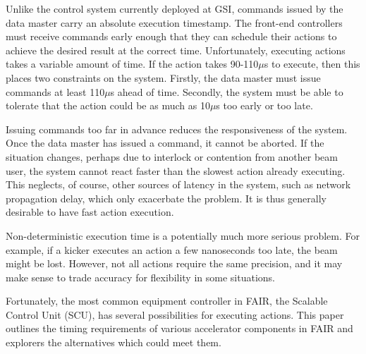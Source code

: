\documentclass{JAC2003}
\begin{document}
Unlike the control system currently deployed at GSI,
commands issued by the data master carry an absolute execution timestamp.
The front-end controllers must receive commands early enough 
that they can schedule their actions 
to achieve the desired result at the correct time.
Unfortunately, executing actions takes a variable amount of time.
If the action takes 90-110$\mu$s to execute, 
then this places two constraints on the system.
Firstly, the data master must issue commands at least 110$\mu$s ahead of time.
Secondly, the system must be able to tolerate that the action could be as
much as 10$\mu$s too early or too late.

Issuing commands too far in advance reduces the responsiveness of the system.
Once the data master has issued a command, it cannot be aborted.
If the situation changes,
perhaps due to interlock or contention from another beam user,
the system cannot react faster than the slowest action already executing.
This neglects, of course, other sources of latency in the system,
such as network propagation delay, which only exacerbate the problem.
It is thus generally desirable to have fast action execution.

Non-deterministic execution time is a potentially much more serious problem.
For example, if a kicker executes an action a few nanoseconds too late,
the beam might be lost.
However, not all actions require the same precision,
and it may make sense to trade accuracy for flexibility in some situations.

Fortunately, the  most common equipment controller in FAIR, 
the Scalable Control Unit (SCU),
has several possibilities for executing actions.
This paper outlines the timing requirements of various accelerator
components in FAIR and explorers the alternatives which could meet them.
\end{document}
